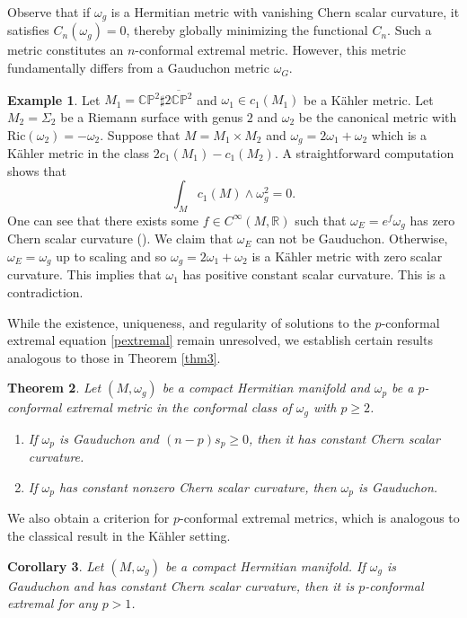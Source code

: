 \documentclass[12pt]{amsart}
\theoremstyle{plain}
\newtheorem{thm}{Theorem}[section]
\newtheorem{cor}[thm]{Corollary}
\theoremstyle{definition}
\newtheorem{example}[thm]{Example}
\newcommand{\bcorollary}{\begin{cor}}
\newcommand{\ecorollary}{\end{cor}}
\renewcommand{\bar}{\overline}
\newcommand{\beq}{\begin{equation}}
\newcommand{\eeq}{\end{equation}}
\newcommand{\bd}{\begin{enumerate}}
\newcommand{\ed}{\end{enumerate}}
\renewcommand{\>}{\rightarrow}
\newcommand{\C}{{\mathbb C}}
\renewcommand{\P}{{\mathbb P}}
\newcommand{\R}{{\mathbb R}}
\renewcommand{\#}{\sharp}
\numberwithin{equation}{section} %
\begin{document}
\noindent Observe that if  $\omega_g$
is a Hermitian metric with vanishing Chern scalar curvature, it satisfies
$C_n(\omega_g)=0$,  thereby globally minimizing the functional $C_n$. Such a metric constitutes an $n$-conformal extremal metric. However, this metric fundamentally differs from a Gauduchon metric $\omega_G$.

\begin{example} Let $M_1=\C\P^2\#\bar{2\C\P^2}$ and $\omega_1\in c_1(M_1)$ be a K\"ahler metric.  Let $M_2=\Sigma_2$ be a Riemann surface with genus $2$ and $\omega_2$ be the canonical metric with $\mathrm{Ric}(\omega_2)=-\omega_2$. Suppose that $M=M_1\times M_2$ and $\omega_g=2\omega_1+\omega_2$ which is a K\"ahler metric in the class $2c_1(M_1)-c_1(M_2)$. A straightforward computation shows that
    \beq \int_M c_1(M)\wedge \omega_g^2=0. \eeq
    One can see that there exists some $f\in C^\infty(M,\R)$ such that $\omega_E= e^f \omega_g$ has zero Chern scalar curvature (\cite[Theorem~1.2]{WangYang2022}). We claim that $\omega_E$ can  not be Gauduchon. Otherwise, $\omega_E=\omega_g$ up to scaling and so $\omega_g=2\omega_1+\omega_2$ is a K\"ahler metric with zero scalar curvature. This implies that $\omega_1$ has positive constant scalar curvature. This is a contradiction.
\end{example}

While the existence, uniqueness, and regularity of solutions to the $p$-conformal extremal equation \eqref{pextremal} remain unresolved, we establish certain results analogous to those in Theorem \ref{thm3}.

    \begin{thm}\label{thm4}
    Let $(M,\omega_g)$ be a compact Hermitian manifold and $\omega_p$ be a $p$-conformal extremal metric in the conformal class of $\omega_g$ with $p\geq 2$.
    \bd \item
    If $\omega_p$ is Gauduchon and $(n-p)s_p\geq 0$, then it has constant Chern scalar curvature.
    \item
    If $\omega_p$ has constant nonzero Chern scalar curvature, then $\omega_p$ is Gauduchon.
    \ed

\end{thm}


\noindent We also obtain a  criterion for $p$-conformal extremal metrics, which is analogous to the classical result in the K\"ahler setting.
\bcorollary \label{cor1} Let $(M,\omega_g)$ be a compact Hermitian manifold. If $\omega_g$ is Gauduchon and has constant Chern scalar curvature, then it is $p$-conformal extremal for any $p>1$.
\ecorollary
\end{document}
